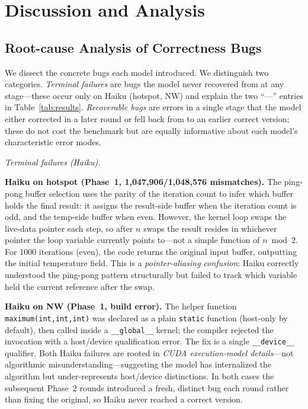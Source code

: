 \documentclass[conference]{IEEEtran}
\begin{document}
\section{Discussion and Analysis}
\label{sec:discussion}

\subsection{Root-cause Analysis of Correctness Bugs}

We dissect the concrete bugs each model introduced. We distinguish two
categories. \emph{Terminal failures} are bugs the model never recovered from
at any stage---these occur only on Haiku (hotspot, NW) and explain
the two ``---'' entries in Table~\ref{tab:results}. \emph{Recoverable bugs} are
errors in a single stage that the model either corrected in a later round or
fell back from to an earlier correct version; these do not cost the benchmark
but are equally informative about each model's characteristic error modes.

\medskip\noindent\textit{Terminal failures (Haiku).}

\textbf{Haiku on hotspot (Phase~1, 1,047,906/1,048,576 mismatches).}
The ping-pong buffer selection uses the parity of the iteration count to infer
which buffer holds the final result: it assigns the result-side buffer when the
iteration count is odd, and the temp-side buffer when even.
However, the kernel loop swaps the live-data pointer each step, so after
$n$ swaps the result resides in whichever pointer the loop variable currently
points to---not a simple function of $n \bmod 2$. For 1000 iterations (even),
the code returns the original input buffer, outputting the initial temperature
field. This is a \emph{pointer-aliasing confusion}: Haiku correctly understood
the ping-pong pattern structurally but failed to track which
variable held the current reference after the swap.

\textbf{Haiku on NW (Phase~1, build error).}
The helper function \texttt{maximum(int,int,int)} was declared as a plain
\texttt{static} function (host-only by default), then called inside a
\texttt{\_\_global\_\_} kernel; the compiler rejected the invocation with a
host/device qualification error.
The fix is a single \texttt{\_\_device\_\_} qualifier. Both Haiku failures are
rooted in \emph{CUDA execution-model details}---not algorithmic
misunderstanding---suggesting the model has internalized the algorithm but
under-represents host/device distinctions. In both cases the subsequent Phase~2
rounds introduced a fresh, distinct bug each round rather than fixing the
original, so Haiku never reached a correct version.
\end{document}
